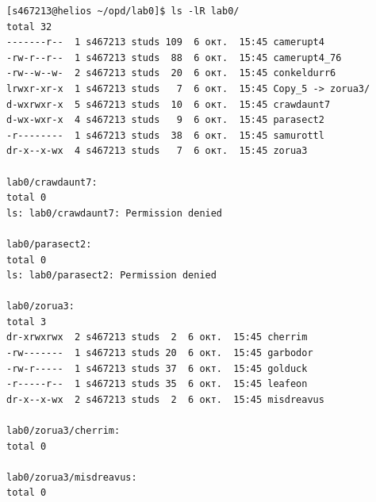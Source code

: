 \begin{verbatim}
[s467213@helios ~/opd/lab0]$ ls -lR lab0/
total 32
-------r--  1 s467213 studs 109  6 окт.  15:45 camerupt4
-rw-r--r--  1 s467213 studs  88  6 окт.  15:45 camerupt4_76
-rw--w--w-  2 s467213 studs  20  6 окт.  15:45 conkeldurr6
lrwxr-xr-x  1 s467213 studs   7  6 окт.  15:45 Copy_5 -> zorua3/
d-wxrwxr-x  5 s467213 studs  10  6 окт.  15:45 crawdaunt7
d-wx-wxr-x  4 s467213 studs   9  6 окт.  15:45 parasect2
-r--------  1 s467213 studs  38  6 окт.  15:45 samurottl
dr-x--x-wx  4 s467213 studs   7  6 окт.  15:45 zorua3

lab0/crawdaunt7:
total 0
ls: lab0/crawdaunt7: Permission denied

lab0/parasect2:
total 0
ls: lab0/parasect2: Permission denied

lab0/zorua3:
total 3
dr-xrwxrwx  2 s467213 studs  2  6 окт.  15:45 cherrim
-rw-------  1 s467213 studs 20  6 окт.  15:45 garbodor
-rw-r-----  1 s467213 studs 37  6 окт.  15:45 golduck
-r-----r--  1 s467213 studs 35  6 окт.  15:45 leafeon
dr-x--x-wx  2 s467213 studs  2  6 окт.  15:45 misdreavus

lab0/zorua3/cherrim:
total 0

lab0/zorua3/misdreavus:
total 0
\end{verbatim}

